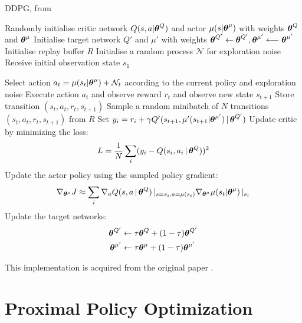 \begin{algorithm}
\caption{DDPG, from \cite{DDPG}} \label{alg:DDPG}
\begin{algorithmic}[1]
\State Randomly initialise critic network $Q(s,a | \boldsymbol{\theta}^Q)$ and actor $\mu(s|\boldsymbol{\theta}^\mu)$ with weights $\boldsymbol{\theta}^Q$ and $\boldsymbol{\theta}^\mu$
\State Initialise target network $Q'$ and $\mu'$ with weights $\boldsymbol{\theta}^{Q'} \leftarrow \boldsymbol{\theta}^{Q'}, \boldsymbol{\theta}^{\mu'} \longleftarrow \boldsymbol{\theta}^{\mu'}$  
\State Initialise replay buffer $R$
\State Initialise a random process $\mathcal{N}$ for exploration noise
\State Receive initial observation state $s_1$  %

        \State Select action $a_t = \mu(s_t | \boldsymbol{\theta}^{\mu}) + \mathcal{N}_t$ according to the current policy and exploration noise 
        \State Execute action $a_t$ and observe reward $r_t$ and observe new state $s_{t+1}$
        \State Store transition $(s_t, a_t, r_t, s_{t+1})$
        \State Sample a random minibatch of $N$ transitions $(s_t, a_t, r_t, s_{t+1})$ from $R$
        \State Set $y_i = r_i + \gamma Q'(s_{t+1}, \mu'( s_{t+1}| \boldsymbol{\theta}^{\mu'}) \,|\, \boldsymbol{\theta}^{Q'} )$ 
        \State Update critic by minimizing the loss:
        \begin{equation*}
            L = \frac{1}{N} \sum_i (y_i - Q(s_i, a_i \,|\, \boldsymbol{\theta}^Q))^2
        \end{equation*}
        \State Update the actor policy using the sampled policy gradient:
        \begin{equation*}
            \nabla_{\boldsymbol{\theta}^\mu} J \approx \sum_i \nabla_a Q(s, a \,|\, \boldsymbol{\theta}^Q) \,|_{s=s_i, a=\mu(s_i)} \nabla_{\boldsymbol{\theta}^\mu} \mu(s_t | \boldsymbol{\theta}^{\mu}) \,|_{s_i}
        \end{equation*}
        \State Update the target networks:
        \begin{align*}
            \boldsymbol{\theta}^{Q'} &\leftarrow \tau \boldsymbol{\theta}^Q + (1-\tau) \boldsymbol{\theta}^{Q'}  \\
            \boldsymbol{\theta}^{\mu'} &\leftarrow  \tau \boldsymbol{\theta}^\mu + (1-\tau) \boldsymbol{\theta}^{\mu'} 
        \end{align*}
    \EndFor
\EndFor
\end{algorithmic}
\end{algorithm}
\noindent
This implementation is acquired from the original paper \cite{DDPG}.
\newpage

\section{Proximal Policy Optimization}
\label{app:algs_PPO}

